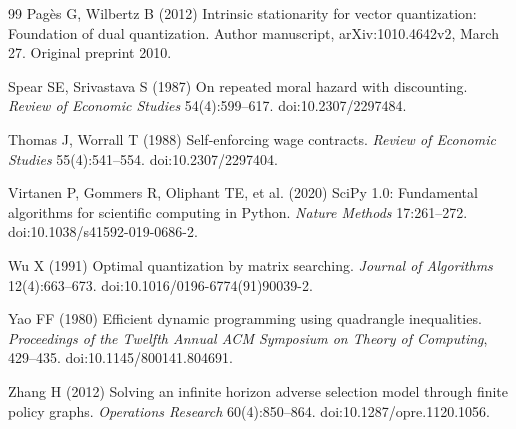 \begin{thebibliography}{99}
Pag\`es G, Wilbertz B (2012) Intrinsic stationarity for vector quantization: Foundation of dual quantization. Author manuscript, arXiv:1010.4642v2, March 27. Original preprint 2010.

Spear SE, Srivastava S (1987) On repeated moral hazard with discounting. \emph{Review of Economic Studies} 54(4):599--617. doi:10.2307/2297484.

Thomas J, Worrall T (1988) Self-enforcing wage contracts. \emph{Review of Economic Studies} 55(4):541--554. doi:10.2307/2297404.

Virtanen P, Gommers R, Oliphant TE, et al. (2020) SciPy 1.0: Fundamental algorithms for scientific computing in Python. \emph{Nature Methods} 17:261--272. doi:10.1038/s41592-019-0686-2.

Wu X (1991) Optimal quantization by matrix searching. \emph{Journal of Algorithms} 12(4):663--673. doi:10.1016/0196-6774(91)90039-2.

Yao FF (1980) Efficient dynamic programming using quadrangle inequalities. \emph{Proceedings of the Twelfth Annual ACM Symposium on Theory of Computing}, 429--435. doi:10.1145/800141.804691.

Zhang H (2012) Solving an infinite horizon adverse selection model through finite policy graphs. \emph{Operations Research} 60(4):850--864. doi:10.1287/opre.1120.1056.
\end{thebibliography}
